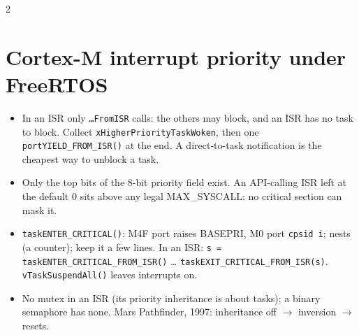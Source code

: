 \documentclass[8pt]{extarticle}
\newcommand\ct[1]{\texttt{#1}}
\begin{document}
\begin{multicols}{2}
\section{Cortex-M interrupt priority under FreeRTOS}
\begin{itemize}
  \item In an ISR only \ct{…FromISR} calls: the others may block, and an ISR has no task to
        block. Collect \ct{xHigherPriorityTaskWoken}, then one \ct{portYIELD\_FROM\_ISR()} at the
        end. A direct-to-task notification is the cheapest way to unblock a task.
  \item Only the top bits of the 8-bit priority field exist. An API-calling ISR left at the
        default 0 sits above any legal MAX\_SYSCALL: no critical section can mask it.
  \item \ct{taskENTER\_CRITICAL()}: M4F port raises BASEPRI, M0 port \ct{cpsid i}; nests (a
        counter); keep it a few lines. In an ISR: \ct{s = taskENTER\_CRITICAL\_FROM\_ISR()} …
        \ct{taskEXIT\_CRITICAL\_FROM\_ISR(s)}. \ct{vTaskSuspendAll()} leaves interrupts on.
  \item No mutex in an ISR (its priority inheritance is about tasks); a binary semaphore has none.
        Mars Pathfinder, 1997: inheritance off $\rightarrow$ inversion $\rightarrow$ resets.
\end{itemize}


\end{multicols}
\end{document}
